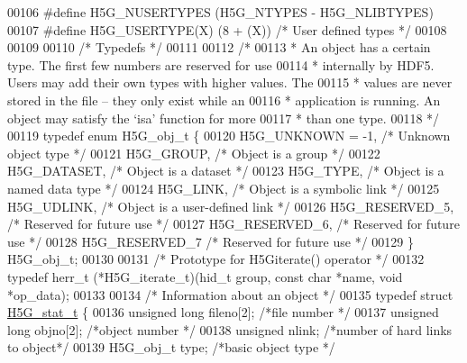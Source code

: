 \begin{DoxyCode}
00106 \textcolor{preprocessor}{#define H5G\_NUSERTYPES  (H5G\_NTYPES - H5G\_NLIBTYPES)}
00107 \textcolor{preprocessor}{#define H5G\_USERTYPE(X) (8 + (X))   }\textcolor{comment}{/* User defined types       */}\textcolor{preprocessor}{}
00108 
00109 
00110 \textcolor{comment}{/* Typedefs */}
00111 
00112 \textcolor{comment}{/*}
00113 \textcolor{comment}{ * An object has a certain type. The first few numbers are reserved for use}
00114 \textcolor{comment}{ * internally by HDF5. Users may add their own types with higher values.  The}
00115 \textcolor{comment}{ * values are never stored in the file -- they only exist while an}
00116 \textcolor{comment}{ * application is running.  An object may satisfy the `isa' function for more}
00117 \textcolor{comment}{ * than one type.}
00118 \textcolor{comment}{ */}
00119 \textcolor{keyword}{typedef} \textcolor{keyword}{enum} H5G\_obj\_t \{
00120     H5G\_UNKNOWN = -1,       \textcolor{comment}{/* Unknown object type      */}
00121     H5G\_GROUP,              \textcolor{comment}{/* Object is a group        */}
00122     H5G\_DATASET,        \textcolor{comment}{/* Object is a dataset      */}
00123     H5G\_TYPE,           \textcolor{comment}{/* Object is a named data type  */}
00124     H5G\_LINK,               \textcolor{comment}{/* Object is a symbolic link    */}
00125     H5G\_UDLINK,             \textcolor{comment}{/* Object is a user-defined link */}
00126     H5G\_RESERVED\_5,     \textcolor{comment}{/* Reserved for future use  */}
00127     H5G\_RESERVED\_6,     \textcolor{comment}{/* Reserved for future use  */}
00128     H5G\_RESERVED\_7      \textcolor{comment}{/* Reserved for future use  */}
00129 \} H5G\_obj\_t;
00130 
00131 \textcolor{comment}{/* Prototype for H5Giterate() operator */}
00132 \textcolor{keyword}{typedef} herr\_t (*H5G\_iterate\_t)(hid\_t group, \textcolor{keyword}{const} \textcolor{keywordtype}{char} *name, \textcolor{keywordtype}{void} *op\_data);
00133 
00134 \textcolor{comment}{/* Information about an object */}
00135 \textcolor{keyword}{typedef} \textcolor{keyword}{struct }\hyperlink{struct_h5_g__stat__t}{H5G\_stat\_t} \{
00136     \textcolor{keywordtype}{unsigned} \textcolor{keywordtype}{long}   fileno[2];  \textcolor{comment}{/*file number           */}
00137     \textcolor{keywordtype}{unsigned} \textcolor{keywordtype}{long}   objno[2];   \textcolor{comment}{/*object number         */}
00138     \textcolor{keywordtype}{unsigned}        nlink;      \textcolor{comment}{/*number of hard links to object*/}
00139     H5G\_obj\_t       type;       \textcolor{comment}{/*basic object type     */}

\end{DoxyCode}
